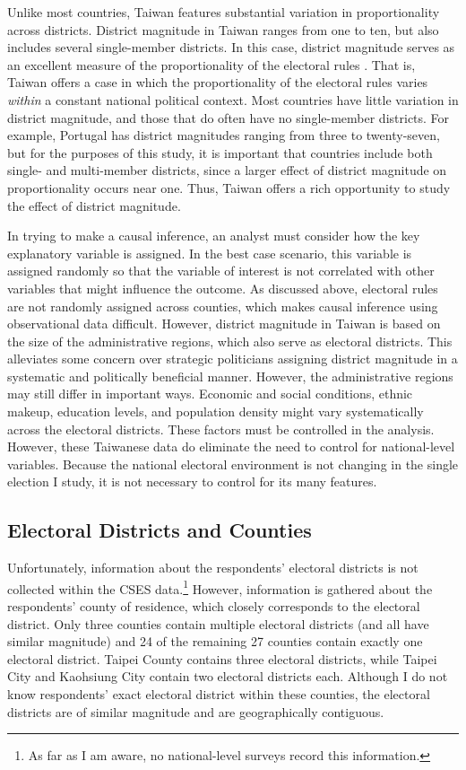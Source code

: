 \documentclass[12pt]{article}
\begin{document}
Unlike most countries, Taiwan features substantial variation in proportionality across districts. District magnitude in Taiwan ranges from one to ten, but also includes several single-member districts. In this case, district magnitude serves as an excellent measure of the proportionality of the electoral rules \citep{Cox1990, Benoit2000}. That is, Taiwan offers a case in which the proportionality of the electoral rules varies \textit{within} a constant national political context. Most countries have little variation in district magnitude, and those that do often have no single-member districts. For example, Portugal has district magnitudes ranging from three to twenty-seven, but for the purposes of this study, it is important that countries include both single- and multi-member districts, since a larger effect of district magnitude on proportionality occurs near one. Thus, Taiwan offers a rich opportunity to study the effect of district magnitude. 

In trying to make a causal inference, an analyst must consider how the key explanatory variable is assigned. In the best case scenario, this variable is assigned randomly so that the variable of interest is not correlated with other variables that might influence the outcome. As discussed above, electoral rules are not randomly assigned across counties, which makes causal inference using observational data difficult. However, district magnitude in Taiwan is based on the size of the administrative regions, which also serve as electoral districts. This alleviates some concern over strategic politicians assigning district magnitude in a systematic and politically beneficial manner. However, the administrative regions may still differ in important ways. Economic and social conditions, ethnic makeup, education levels, and population density might vary systematically across the electoral districts. These factors must be controlled in the analysis. However, these Taiwanese data do eliminate the need to control for national-level variables. Because the national electoral environment is not changing in the single election I study, it is not necessary to control for its many features.

\subsection*{Electoral Districts and Counties}

Unfortunately, information about the respondents' electoral districts is not collected within the CSES data.\footnote{As far as I am aware, no national-level surveys record this information.} However, information is gathered about the respondents' county of residence, which closely corresponds to the electoral district. Only three counties contain multiple electoral districts (and all have similar magnitude) and 24 of the remaining 27 counties contain exactly one electoral district. Taipei County contains three electoral districts, while Taipei City and Kaohsiung City contain two electoral districts each. Although I do not know respondents' exact electoral district within these counties, the electoral districts are of similar magnitude and are geographically contiguous.
\end{document}
